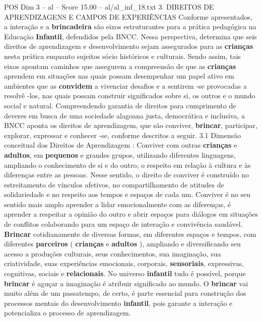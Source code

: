 \begin{textsample}{POS Dim 3 – al – Score 15.00 – al/al\_inf\_18.txt}  \label{ex:f3_pos_219}
3.
DIREITOS DE APRENDIZAGENS E CAMPOS DE EXPERIÊNCIAS Conforme apresentados, a interação e a \textbf{brincadeira} são eixos estruturantes para a prática pedagógica na Educação \textbf{Infantil}, defendidos pela BNCC.
Nessa perspectiva, determina que seis direitos de aprendizagem e desenvolvimento sejam assegurados para as \textbf{crianças} nesta prática enquanto sujeitos sócio históricos e culturais.
Sendo assim, tais eixos apontam caminhos que assegurem a compreensão de que as \textbf{crianças} aprendem em situações nas quais possam desempenhar um papel ativo em ambientes que as \textbf{convidem} a vivenciar desafios e a sentirem -se provocadas a resolvê -los, nas quais possam construir significados sobre si, os outros e o mundo social e natural.
Compreendendo garantia de direitos para cumprimento de deveres em busca de uma sociedade alagoana justa, democrática e inclusiva, a BNCC aponta os direitos de aprendizagem, que são conviver, \textbf{brincar}, participar, explorar, expressar e conhecer -se, conforme descritos a seguir. 3.1 Dimensão conceitual dos Direitos de Aprendizagem : Conviver com outras \textbf{crianças} e \textbf{adultos}, em \textbf{pequenos} e grandes grupos, utilizando diferentes linguagens, ampliando o conhecimento de si e do outro, o respeito em relação à cultura e às diferenças entre as pessoas.
Nesse sentido, o direito de conviver é construído no estreitamento de vínculos afetivos, no compartilhamento de atitudes de solidariedade e no respeito aos tempos e espaços de cada um.
Conviver é no seu sentido mais amplo aprender a lidar emocionalmente com as diferenças, é aprender a respeitar a opinião do outro e abrir espaços para diálogos em situações de conflitos colaborando para um espaço de interação e convivência saudável. \textbf{Brincar} cotidianamente de diversas formas, em diferentes espaços e tempos, com diferentes \textbf{parceiros} ( \textbf{crianças} e \textbf{adultos} ), ampliando e diversificando seu acesso a produções culturais, seus conhecimentos, sua imaginação, sua criatividade, suas experiências emocionais, corporais, \textbf{sensoriais}, expressivas, cognitivas, sociais e \textbf{relacionais}.
No universo \textbf{infantil} tudo é possível, porque \textbf{brincar} é aguçar a imaginação é atribuir significado ao mundo.
O \textbf{brincar} vai muito além de um passatempo, de certo, é parte essencial para construção dos processos mentais do desenvolvimento \textbf{infantil}, pois garante a interação e potencializa o processo de aprendizagem.

\end{textsample}
